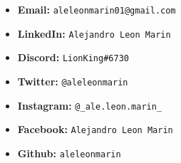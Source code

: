 \documentclass{article}
\begin{document}
\begin{itemize}
    \item \textbf{Email:} \texttt{aleleonmarin01@gmail.com}
    \item \textbf{LinkedIn:} \texttt{Alejandro Leon Marin}
    \item \textbf{Discord: }\texttt{LionKing\#6730}
    \item \textbf{Twitter:} \texttt{@aleleonmarin}
    \item \textbf{Instagram:} \texttt{@\_ale.leon.marin\_}
    \item \textbf{Facebook: }\texttt{Alejandro Leon Marin}
    \item \textbf{Github:} \texttt{aleleonmarin}
\end{itemize}
\end{document}
